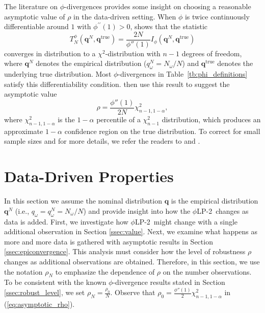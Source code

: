 \documentclass[opre,nonblindrev]{informs3} %
\newcommand{\q}{\mathbf{q}}
\newcommand{\qtrue}{\q^{\text{true}}}
\newcommand{\plp}{$\phi$LP-2}
\begin{document}
The literature on $\phi$-divergences provides some insight on choosing a reasonable asymptotic value of $\rho$ in the data-driven setting. 
When $\phi$ is twice continuously differentiable around $1$ with $\phi^{\prime \prime}(1)>0$, \citet[Theorem 3.1]{pardo2005statistical} shows that the statistic
\[
	T^\phi_N(\q^N,\qtrue) = \frac{2N}{\phi''(1)} I_{\phi}(\q^N, \qtrue)
\]
converges in distribution to a $\chi^2$-distribution with $n-1$ degrees of freedom, where $\q^N$ denotes the empirical distribution ($q^N_\omega = N_\omega/N$) and $\qtrue$ denotes the underlying true distribution.
Most $\phi$-divergences in Table~\ref{tb:phi_definitions} satisfy this differentiability condition.
\citet{bental2011robust} then use this result to suggest the asymptotic value
\begin{equation} \label{eq:asymptotic_rho}
	\rho = \frac{\phi''(1)}{2N} \chi^2_{n-1,1-\alpha},
\end{equation}
where $\chi^2_{n-1,1-\alpha}$ is the $1-\alpha$ percentile of a $\chi^2_{n-1}$ distribution, which produces an approximate $1-\alpha$ confidence region on the true distribution.
To correct for small sample sizes and for more details, we refer the readers to \cite{pardo2005statistical} and \cite{bental2011robust}. 


\section{Data-Driven Properties}
\label{sec:properties}

In this section we assume the nominal distribution $\q$ is the empirical distribution $\q^{N}$ (i.e., $q_\omega=q_\omega^N = {N_\omega}/{N}$) and provide insight into how the \plp\ changes as data is added.
First, we investigate how \plp\ might change with a single additional observation in Section \ref{ssec:value}. 
Next, we examine what happens as more and more data is gathered with asymptotic results in Section \ref{ssec:epiconvergence}.
This analysis must consider how the level of robustness $\rho$ changes as additional observations are obtained. 
Therefore, in this section, we use the notation $\rho_N$ to emphasize the dependence of $\rho$ on the number observations.
To be consistent with the known $\phi$-divergence results stated in Section \ref{ssec:robust_level}, we set $\rho_N = \frac{\rho_0}{N}$.
Observe that $\rho_0=\frac{\phi''(1)}{2} \chi^2_{n-1,1-\alpha}$ in (\ref{eq:asymptotic_rho}). 
\end{document}
